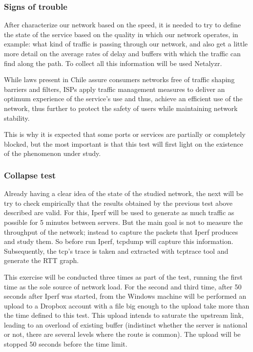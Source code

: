 \subsubsection{Signs of trouble} 
After characterize our network based on the
speed, it is needed to try to define the state of the service based on the
quality in which our network operates, in example: what kind of traffic is
passing through our network, and also get a little more detail on the
average rates of delay and buffers with which the traffic can find along the
path. To collect all this information will be used Netalyzr. 

While laws present in Chile assure consumers networks free of traffic shaping
barriers and filters, ISPs apply traffic management
measures\cite{shapemov}\cite{shapevtr} to deliver an optimum experience of the
service's use and thus, achieve an efficient use of the network, thus further to
protect the safety of users while maintaining network stability.

This is why it is expected that some ports or services are partially or
completely blocked, but the most important is that this test will first light on
the existence of the phenomenon under study.

\subsubsection{Collapse test} 
Already having a clear idea of the state of the studied network, the next will
be try to check empirically that the results obtained by the previous test
above described are valid. For this, Iperf will be used to generate as much
traffic as possible for 5 minutes between servers. But the main goal is not to
measure the throughput of the network; instead to capture the packets that
Iperf produces and study them. So before run Iperf, tcpdump will capture this
information. Subsequently, the tcp's trace is taken and extracted with
tcptrace tool and generate the RTT graph.

This exercise will be conducted three times as part of the test, running the
first time as the sole source of network load. For the second and third time,
after 50 seconds after Iperf was started, from the Windows machine will be 
performed an upload to a Dropbox account with a file big enough to the upload 
take more than the time defined to this test. This upload intends to saturate 
the upstream link, leading to an overload of existing buffer (indistinct 
whether the server is national or not, there are several levels where the 
route is common). The upload will be stopped 50 seconds before the time limit.

